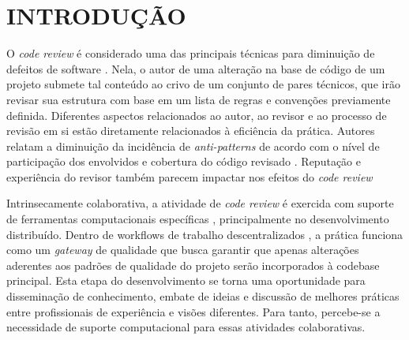 \documentclass[preprint,review, 12pt]{elsarticle}
\begin{document}










\section{INTRODUÇÃO}  %

  O \textit{code review} é considerado uma das principais técnicas para diminuição de defeitos de software \cite{Boehm2001}. Nela, o autor de uma alteração na base de código de um projeto submete tal conteúdo ao crivo de um conjunto de pares técnicos, que irão revisar sua estrutura com base em um lista de regras e convenções previamente definida. Diferentes aspectos relacionados ao autor, ao revisor e ao processo de revisão em si estão diretamente relacionados à eficiência da prática. Autores relatam a diminuição da incidência de \textit{anti-patterns} \cite{Kemerer2009} de acordo com o nível de participação dos envolvidos e cobertura do código revisado \cite{Meneely201437, Morales2015171, Bavota201581}. Reputação \cite{Baysal2013122, Bosu2014} e experiência \cite{Kononenko2015111} do revisor também parecem impactar nos efeitos do \textit{code review}

  Intrinsecamente colaborativa, a atividade de \textit{code review} é exercida com suporte de ferramentas computacionais específicas \cite{Bacchelli2013}, principalmente no desenvolvimento distribuído. Dentro de workflows de trabalho descentralizados \cite{gousios2016}, a prática funciona como um \textit{gateway} de qualidade que busca garantir que apenas alterações aderentes aos padrões de qualidade do projeto serão incorporados à codebase principal. Esta etapa do desenvolvimento se torna uma oportunidade para disseminação de conhecimento, embate de ideias e discussão de melhores práticas entre profissionais de experiência e visões diferentes. Para tanto, percebe-se a necessidade de suporte computacional para essas atividades colaborativas.
\end{document}
